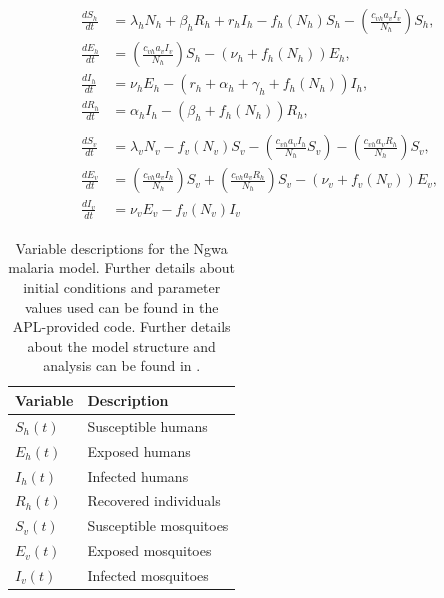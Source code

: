 \documentclass[letter,12pt, usenames,dvipsnames]{article}
\begin{document}
\begin{align}
\label{eqn:malariaEquations}
\begin{split}
\frac{dS_h}{dt} &= \lambda_h N_h +\beta_h R_h + r_h I_h - f_h(N_h)S_h -\left(\frac{c_{vh}a_vI_v}{N_h}\right)S_h,\\
\frac{dE_h}{dt}&= \left(\frac{c_{vh}a_vI_v}{N_h}\right)S_h - (\nu_h + f_h(N_h))E_h,\\
\frac{dI_h}{dt}&= \nu_hE_h - (r_h + \alpha_h + \gamma_h + f_h(N_h))I_h,\\
\frac{dR_h}{dt}&= \alpha_hI_h - (\beta_h + f_h(N_h))R_h,\\\\
\frac{dS_v}{dt} &= \lambda_vN_v - f_v(N_v)S_v - \left(\frac{c_{vh}a_vI_h}{N_h}S_v\right) - \left(\frac{c_{vh}a_vR_h}{N_h}\right)S_v,\\
\frac{dE_v}{dt}&= \left(\frac{c_{vh}a_vI_h}{N_h}\right)S_v + \left(\frac{c_{vh}a_vR_h}{N_h}\right)S_v - (\nu_v + f_v(N_v))E_v,\\
\frac{dI_v}{dt}&= \nu_vE_v - f_v(N_v)I_v
\end{split}
\end{align}

\begin{table}[h!]
\centering
\begin{tabular}{| l | l |}
\hline
Variable & Description \\\hline\hline 
$S_h(t)$ & Susceptible  humans\\\hline
$E_h(t)$ & Exposed humans\\\hline
$I_h(t)$ & Infected humans\\\hline
$R_h(t)$ & Recovered  individuals\\\hline
$S_v(t)$ & Susceptible  mosquitoes\\\hline
$E_v(t)$ & Exposed  mosquitoes\\\hline
$I_v(t)$ & Infected mosquitoes\\ \hline
\end{tabular}
\caption{Variable descriptions for the Ngwa malaria model.  Further details about initial conditions and parameter values used can be found in the APL-provided code.  Further details about the model structure and analysis can be found in \cite{malaria}.}
\label{table:MalariaVariables}
\end{table}
\end{document}
